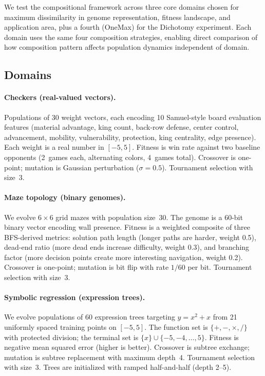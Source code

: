 \documentclass[sigconf]{acmart}
\begin{document}
We test the compositional framework across three core domains chosen for maximum dissimilarity in genome representation, fitness landscape, and application area, plus a fourth (OneMax) for the Dichotomy experiment. Each domain uses the same four composition strategies, enabling direct comparison of how composition pattern affects population dynamics independent of domain.

\subsection{Domains}

\paragraph{Checkers (real-valued vectors).}
Populations of 30 weight vectors, each encoding 10 Samuel-style board evaluation features (material advantage, king count, back-row defense, center control, advancement, mobility, vulnerability, protection, king centrality, edge presence).
Each weight is a real number in $[-5, 5]$. Fitness is win rate against two baseline opponents (2~games each, alternating colors, 4~games total). Crossover is one-point; mutation is Gaussian perturbation ($\sigma = 0.5$). Tournament selection with size~3.

\paragraph{Maze topology (binary genomes).}
We evolve $6 \times 6$ grid mazes with population size~30. The genome is a 60-bit binary vector encoding wall presence. Fitness is a weighted composite of three BFS-derived metrics: solution path length (longer paths are harder, weight 0.5), dead-end ratio (more dead ends increase difficulty, weight 0.3), and branching factor (more decision points create more interesting navigation, weight 0.2). Crossover is one-point; mutation is bit flip with rate $1/60$ per bit. Tournament selection with size~3.

\paragraph{Symbolic regression (expression trees).}
We evolve populations of 60 expression trees targeting $y = x^2 + x$ from 21 uniformly spaced training points on $[-5, 5]$. The function set is $\{+, -, \times, /\}$ with protected division; the terminal set is $\{x\} \cup \{-5, -4, \ldots, 5\}$. Fitness is negative mean squared error (higher is better). Crossover is subtree exchange; mutation is subtree replacement with maximum depth~4. Tournament selection with size~3. Trees are initialized with ramped half-and-half (depth 2--5).
\end{document}
